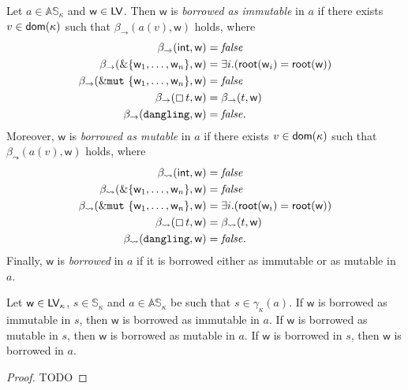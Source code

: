 \begin{definition}\label{def:abstract_borrow}
  Let $a\in\mathbb{AS}_\kappa$ and $\mathsf{w}\in\mathsf{LV}$.
  Then $\mathsf{w}$ is
  \emph{borrowed as immutable} in $a$ if there exists $v\in\mathsf{dom}(\kappa)$ such that
  $\beta_\to(a(v),\mathsf{w})$ holds, where
  \begin{align*}
    \beta_\to(\mathsf{int},\mathsf{w})&=\mathit{false}\\
    \beta_\to(\&\{\mathsf{w}_1,\ldots,\mathsf{w}_n\},\mathsf{w})&=\exists i.(\mathsf{root}(\mathsf{w}_i)=\mathsf{root}(\mathsf{w}))\\
    \beta_\to(\&\mathtt{mut}\ \{\mathsf{w}_1,\ldots,\mathsf{w}_n\},\mathsf{w})&=\mathit{false}\\
    \beta_\to(\boxempty\,{t},\mathsf{w})&=\beta_\to(t,\mathsf{w})\\
    \beta_\to(\mathtt{dangling},\mathsf{w})&=\mathit{false.}
  \end{align*}
  Moreover, $\mathsf{w}$ is
  \emph{borrowed as mutable} in $a$ if there exists $v\in\mathsf{dom}(\kappa)$ such that
  $\beta_\leadsto(a(v),\mathsf{w})$ holds, where
  \begin{align*}
    \beta_\leadsto(\mathsf{int},\mathsf{w})&=\mathit{false}\\
    \beta_\leadsto(\&\{\mathsf{w}_1,\ldots,\mathsf{w}_n\},\mathsf{w})&=\mathit{false}\\
    \beta_\leadsto(\&\mathtt{mut}\ \{\mathsf{w}_1,\ldots,\mathsf{w}_n\},\mathsf{w})&=\exists i.(\mathsf{root}(\mathsf{w}_i)=\mathsf{root}(\mathsf{w}))\\
    \beta_\leadsto(\boxempty\,{t},\mathsf{w})&=\beta_\leadsto(t,\mathsf{w})\\
    \beta_\leadsto(\mathtt{dangling},\mathsf{w})&=\mathit{false.}
  \end{align*}
  Finally, $\mathsf{w}$ is \emph{borrowed} in $a$ if it is borrowed either as immutable
  or as mutable in $a$.
\end{definition}

\begin{proposition}
  \label{prop:abstract_borrow_correctness}
  Let $\mathsf{w}\in\mathsf{LV}_\kappa$, $s\in\mathbb{S}_\kappa$
  and $a\in\mathbb{AS}_\kappa$ be
  such that $s\in\gamma_\kappa(a)$.
  If $\mathsf{w}$ is borrowed as immutable in $s$, then
  $\mathsf{w}$ is borrowed as immutable in $a$.
  If $\mathsf{w}$ is borrowed as mutable in $s$, then
  $\mathsf{w}$ is borrowed as mutable in $a$.
  If $\mathsf{w}$ is borrowed in $s$, then
  $\mathsf{w}$ is borrowed in $a$.
\end{proposition}
\begin{proof}
  TODO
\end{proof}

